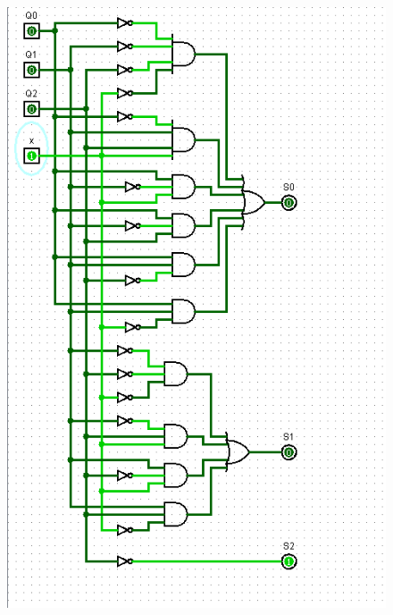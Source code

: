 \documentclass[]{article}
\begin{document}
\begin{minipage}{0.5\textwidth}
\begin{figure}[H]
	\centering
	\includegraphics[width=1\textwidth]{test1_0.png}
\end{figure}
\end{minipage}
\end{document}
